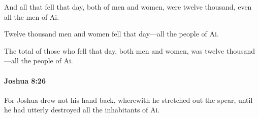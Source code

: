 			\begin{versebox}
					\item[BHS] 
					\item[ASV] And all that fell that day, both of men and women, were twelve thousand, even all the men of Ai.
					\item[NIV] Twelve thousand men and women fell that day—all the people of Ai.
					\item[NRSV] The total of those who fell that day, both men and women, was twelve thousand—all the people of Ai.
			\end{versebox}

		\paragraph{Joshua 8:26} %
			\label{JOSHUA-8-26}

			For Joshua drew not his hand back, wherewith he stretched out the spear, until he had utterly destroyed all the inhabitants of Ai.

